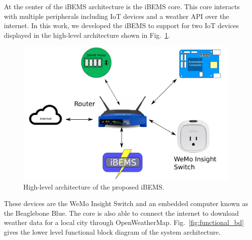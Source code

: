 \documentclass[conference]{IEEEtran}
\begin{document}
At the center of the iBEMS architecture is the iBEMS core. This core interacts
with multiple peripherals including IoT devices and a weather API over the
internet. In this work, we developed the iBEMS to support for two 
IoT devices displayed in the high-level architecture shown in Fig.~\ref{fig:highLevelArchitecture}. %
%
\begin{figure}[htbp]
  \centering
  \includegraphics[scale=0.15]{figs/overallConnectionDiagram.pdf}
  \caption{High-level architecture of the proposed iBEMS.}
  \label{fig:highLevelArchitecture}
\end{figure}
%
These devices are the WeMo Insight Switch and an embedded computer known as the Beaglebone
Blue.  The core is also able to
connect the internet to download weather data for a local city through
OpenWeatherMap. Fig.~\ref{fig:functional_bd} gives the lower level functional block diagram of the system
architecture. %
%
\end{document}
